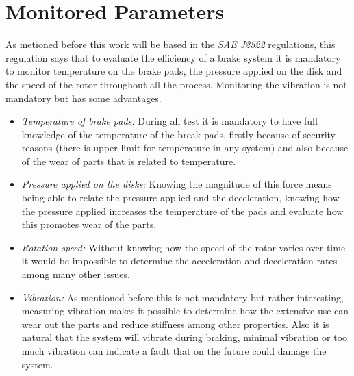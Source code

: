\section{Monitored Parameters}\label{sec:monitored-parameters}
		As metioned before this work will be based in the \textit{SAE J2522} regulations, this regulation says that to evaluate the efficiency of a brake system it is mandatory to monitor temperature on the brake pads, the pressure applied on the disk and the speed of the rotor throughout all the process. Monitoring the vibration is not mandatory but has some advantages.

	\begin{itemize}
		\item\textit{Temperature of brake pads: } During all test it is mandatory to have full knowledge of the temperature of the break pads, firstly because of security reasons (there is upper limit for temperature in any system) and also because of the wear of parts that is related to temperature.\label{itm:temperature-of-brake-pads}
		\item\textit{Pressure applied on the disks: } Knowing the magnitude of this force means being able to relate the pressure applied and the deceleration, knowing how the pressure applied increases the temperature of the pads and evaluate how this promotes wear of the parts.\label{itm:pressure-applied-on-the-disks}
		\item\textit{Rotation speed: } Without knowing how the speed of the rotor varies over time it would be impossible to determine the acceleration and deceleration rates among many other issues.\label{itm:rotation-speed}
		\item\textit{Vibration: } As mentioned before this is not mandatory but rather interesting, measuring vibration makes it possible to determine how the extensive use can wear out the parts and reduce stiffness among other properties. Also it is natural that the system will vibrate during braking, minimal vibration or too much vibration can indicate a fault that on the future could damage the system.\label{itm:vibration}
	\end{itemize}

